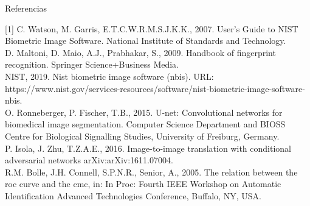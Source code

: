 \documentclass[12pt]{beamer}
\begin{document}
\begin{frame}{Referencias}

{\tiny
[1] C. Watson, M. Garris, E.T.C.W.R.M.S.J.K.K., 2007. User’s Guide to
NIST Biometric Image Software. National Institute of Standards and
Technology.\\
[2] D. Maltoni, D. Maio, A.J., Prabhakar, S., 2009. Handbook of fingerprint recognition. Springer Science+Business Media.\\
[3] NIST, 2019. Nist biometric image software (nbis).
URL: https://www.nist.gov/services-resources/software/nist-biometric-image-software-nbis.\\
[4] O. Ronneberger, P. Fischer, T.B., 2015. U-net: Convolutional networks
for biomedical image segmentation. Computer Science Department and BIOSS Centre for Biological Signalling Studies, University of Freiburg, Germany.\\
[5] P. Isola, J. Zhu, T.Z.A.E., 2016. Image-to-image translation with conditional adversarial networks arXiv:arXiv:1611.07004.\\
[6] R.M. Bolle, J.H. Connell, S.P.N.R., Senior, A., 2005. The relation between the roc curve and the cmc, in: In Proc: Fourth IEEE Workshop on Automatic Identification Advanced Technologies Conference, Buffalo,
NY, USA.
}
    
\end{frame}
\end{document}
